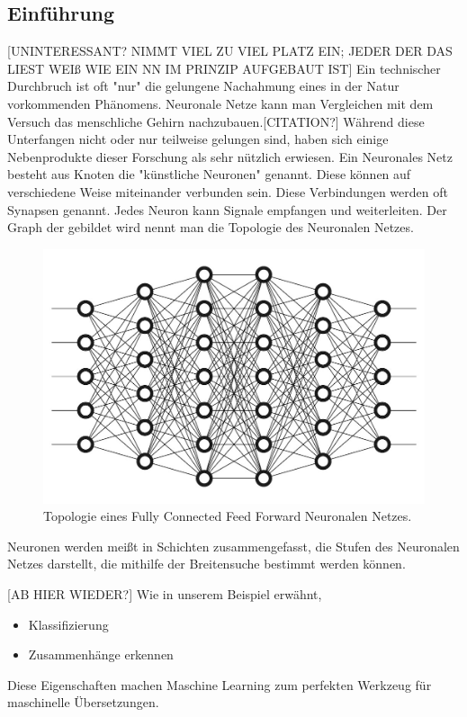 \documentclass{thesisclass}
\begin{document}
	\subsection{Einführung}
		[UNINTERESSANT? NIMMT VIEL ZU VIEL PLATZ EIN; JEDER DER DAS LIEST WEIß WIE EIN NN IM PRINZIP AUFGEBAUT IST]
Ein technischer Durchbruch ist oft "nur" die gelungene Nachahmung eines in der Natur vorkommenden Phänomens. Neuronale Netze kann man Vergleichen mit dem Versuch das menschliche Gehirn nachzubauen.[CITATION?] Während diese Unterfangen nicht oder nur teilweise gelungen sind, haben sich einige Nebenprodukte dieser Forschung als sehr nützlich erwiesen.
Ein Neuronales Netz besteht aus Knoten die "künstliche Neuronen" genannt. Diese können auf verschiedene Weise miteinander verbunden sein. Diese Verbindungen werden oft Synapsen genannt. Jedes Neuron kann Signale empfangen und weiterleiten. Der Graph der gebildet wird nennt man die Topologie des Neuronalen Netzes.

\begin{figure}[H]
  		\includegraphics[width=\linewidth]{images/DeepNeuralNetwork.jpg}
  		\caption{Topologie eines Fully Connected Feed Forward Neuronalen Netzes. 	\cite{NeuronalesNetzImage} }
  		\label{fig:Neuronales Netz}
\end{figure}

Neuronen werden meißt in Schichten zusammengefasst, die Stufen des Neuronalen Netzes darstellt, die mithilfe der Breitensuche bestimmt werden können.

[AB HIER WIEDER?]
Wie in unserem Beispiel erwähnt, 
\begin{itemize}
	\item Klassifizierung
	\item Zusammenhänge erkennen
\end{itemize}
Diese Eigenschaften machen Maschine Learning zum perfekten Werkzeug für maschinelle Übersetzungen.
\end{document}
